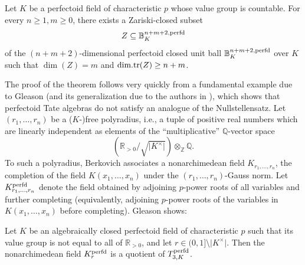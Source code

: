 \begin{thm}\label{thm:dim:noteq}
Let $K$ be a perfectoid field of characteristic $p$ whose value group is countable. 
For every $n\geq1, m\geq0$, there exists a Zariski-closed subset \begin{equation*}Z\subseteq \mathbb{B}_{K}^{n+m+2,\operatorname{perfd}}\end{equation*}of the $(n+m+2)$-dimensional
perfectoid closed unit ball $\mathbb{B}_{K}^{n+m+2,\operatorname{perfd}}$ over $K$ such that $\dim(Z)=m$ and
$\mathrm{dim.tr}(Z)\geq n+m$.\end{thm}
The proof of the theorem follows very quickly from a fundamental example due to Gleason
\cite{gleason-2022-perfectoid-Nullstellensatz} (and its generalization due to the authors in \cite{Dine-Garzella25}), which shows
that perfectoid Tate algebras do not satisfy an analogue of the Nullstellensatz.
Let \((r_{1}, \ldots, r_{n})\) be a ($K$-)free polyradius, i.e., a tuple of positive real numbers which are linearly independent as elements of the ``multiplicative'' $\mathbb{Q}$-vector space \begin{equation*}(\mathbb{R}_{>0}/\sqrt{\vert K^{\times}\vert})\otimes_{\mathbb{Z}}\mathbb{Q}.\end{equation*}
To such a polyradius, Berkovich associates a nonarchimedean field \(K_{r_{1}, \ldots, r_{n}}\),
the completion of the field \(K(x_{1}, \ldots, x_{n})\) 
under the \((r_{1}, \ldots, r_{n})\)-Gauss norm.
Let \(K_{r_{1}, \ldots, r_{n}}^{\operatorname{perfd}}\) denote the field obtained
by adjoining \(p\)-power roots of all variables and further completing
(equivalently, adjoining $p$-power roots of the variables in $K(x_{1},\dots, x_{n})$ before completing).
Gleason shows:
\begin{thm}
Let $K$ be an algebraically closed perfectoid field of characteristic $p$ such that its value group is not equal to all of $\mathbb{R}_{>0}$, 
and let $r\in (0, 1]\setminus \vert K^{\times}\vert$. Then the nonarchimedean field \(K_{r}^{\operatorname{perfd}}\) is a quotient of \(T_{3, K}^{\operatorname{perfd}}\).
\end{thm}


